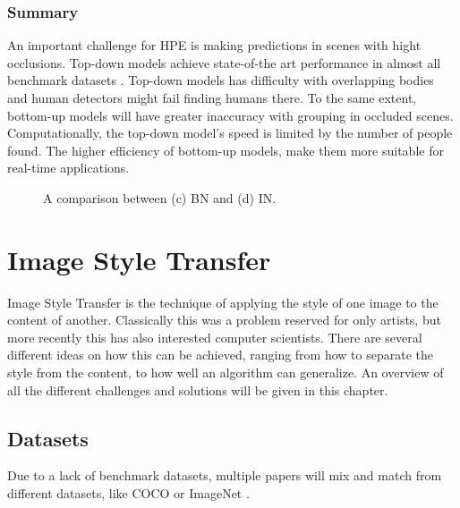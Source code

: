\subsubsection{Summary}
An important challenge for \gls{HPE} is making predictions in scenes with hight occlusions.
Top-down models achieve state-of-the art performance in almost all benchmark datasets \cite{Chen2000}.
Top-down models has difficulty with overlapping bodies and human detectors might fail finding humans there.
To the same extent, bottom-up models will have greater inaccuracy with grouping in occluded scenes.
Computationally, the top-down model's speed is limited by the number of people found.
The higher efficiency of bottom-up models, make them more suitable for real-time applications.

\begin{figure}
	\centering
	\caption{A comparison between (c) \gls{BN} and (d) \gls{IN}.\cite{Ulyanov2017}}
	\label{fig:style_transfer_ulyanov_BN_IN_comparison}
\end{figure}

\section{Image Style Transfer}
Image Style Transfer is the technique of applying the style of one image to the content of another.
Classically this was a problem reserved for only artists, but more recently this has also interested computer scientists.
There are several different ideas on how this can be achieved,
ranging from how to separate the style from the content, to how well an algorithm can generalize.
An overview of all the different challenges and solutions will be given in this chapter.

\subsection{Datasets}
Due to a lack of benchmark datasets, multiple papers will mix and match from different datasets, like \gls{COCO} or ImageNet \cite{Deng2009}.


